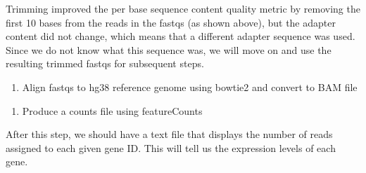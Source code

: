 \documentclass[
]{article}
\newenvironment{Shaded}{\begin{snugshade}}{\end{snugshade}}
\newcommand{\AttributeTok}[1]{\textcolor[rgb]{0.77,0.63,0.00}{#1}}
\newcommand{\CommentTok}[1]{\textcolor[rgb]{0.56,0.35,0.01}{\textit{#1}}}
\newcommand{\ExtensionTok}[1]{#1}
\newcommand{\NormalTok}[1]{#1}
\newcommand{\OperatorTok}[1]{\textcolor[rgb]{0.81,0.36,0.00}{\textbf{#1}}}
\newcommand{\VariableTok}[1]{\textcolor[rgb]{0.00,0.00,0.00}{#1}}
\providecommand{\tightlist}{%
  \setlength{\itemsep}{0pt}\setlength{\parskip}{0pt}}
\begin{document}
Trimming improved the per base sequence content quality metric by
removing the first 10 bases from the reads in the fastqs (as shown
above), but the adapter content did not change, which means that a
different adapter sequence was used. Since we do not know what this
sequence was, we will move on and use the resulting trimmed fastqs for
subsequent steps.

\begin{enumerate}
\def\labelenumi{\arabic{enumi}.}
\setcounter{enumi}{2}
\tightlist
\item
  Align fastqs to hg38 reference genome using bowtie2 and convert to BAM
  file
\end{enumerate}

\begin{Shaded}
\end{Shaded}

\begin{enumerate}
\def\labelenumi{\arabic{enumi}.}
\setcounter{enumi}{3}
\tightlist
\item
  Produce a counts file using featureCounts
\end{enumerate}

After this step, we should have a text file that displays the number of
reads assigned to each given gene ID. This will tell us the expression
levels of each gene.
\end{document}
